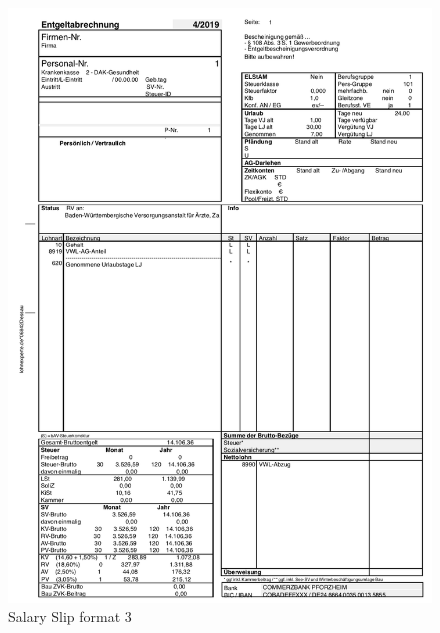 \begin{figure}[H]
\centering
\includegraphics[scale=0.6]{images/GA-Formats/ga-format-3.png}
\caption{Salary Slip format 3}
\label{ls_format2}
\end{figure}
